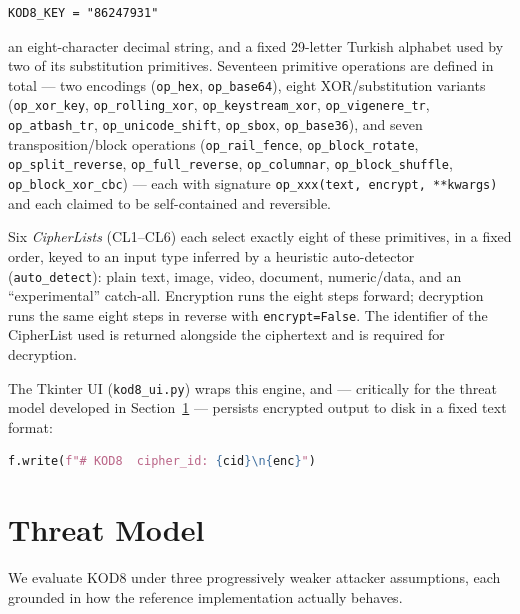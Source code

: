 \documentclass[11pt]{article}
\begin{document}
\begin{lstlisting}
KOD8_KEY = "86247931"
\end{lstlisting}

\sloppy
\noindent
an eight-character decimal string, and a fixed 29-letter Turkish alphabet
used by two of its substitution primitives. Seventeen primitive
operations are defined in total — two encodings
(\texttt{op\_hex}, \texttt{op\_base64}), eight XOR/substitution
variants (\texttt{op\_xor\_key}, \texttt{op\_rolling\_xor},
\texttt{op\_keystream\_xor}, \texttt{op\_vigenere\_tr},
\texttt{op\_atbash\_tr}, \texttt{op\_unicode\_shift}, \texttt{op\_sbox},
\texttt{op\_base36}), and seven transposition/block operations
(\texttt{op\_rail\_fence}, \texttt{op\_block\_rotate},
\texttt{op\_split\_reverse}, \texttt{op\_full\_reverse},
\texttt{op\_columnar}, \texttt{op\_block\_shuffle},
\texttt{op\_block\_xor\_cbc}) — each with signature
\texttt{op\_xxx(text, encrypt, **kwargs)} and each claimed to be
self-contained and reversible.
\fussy

Six \emph{CipherLists} (CL1–CL6) each select exactly eight of these
primitives, in a fixed order, keyed to an input type inferred by a
heuristic auto-detector (\texttt{auto\_detect}): plain text, image,
video, document, numeric/data, and an ``experimental'' catch-all.
Encryption runs the eight steps forward; decryption runs the same eight
steps in reverse with \texttt{encrypt=False}. The identifier of the
CipherList used is returned alongside the ciphertext and is required for
decryption.

The Tkinter UI (\texttt{kod8\_ui.py}) wraps this engine, and — critically
for the threat model developed in Section~\ref{sec:threat} — persists
encrypted output to disk in a fixed text format:

\begin{lstlisting}[language=Python]
f.write(f"# KOD8  cipher_id: {cid}\n{enc}")
\end{lstlisting}

\section{Threat Model}
\label{sec:threat}

We evaluate KOD8 under three progressively weaker attacker assumptions,
each grounded in how the reference implementation actually behaves.
\end{document}

